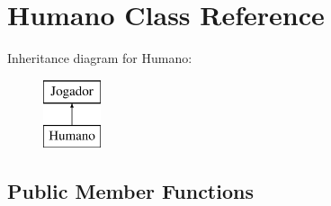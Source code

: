 \hypertarget{class_humano}{}\section{Humano Class Reference}
\label{class_humano}
Inheritance diagram for Humano\+:\begin{figure}[H]
\begin{center}
\leavevmode
\includegraphics[height=2.000000cm]{class_humano}
\end{center}
\end{figure}
\subsection*{Public Member Functions}

